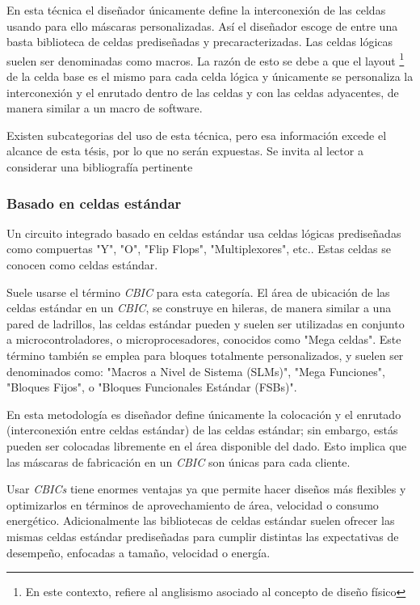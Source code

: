 {En esta técnica el diseñador únicamente define la interconexión de las celdas usando para ello máscaras personalizadas. Así el diseñador escoge de entre una basta biblioteca de celdas prediseñadas y precaracterizadas. Las celdas lógicas suelen ser denominadas como macros. La razón de esto se debe a que el layout \footnote{En este contexto, refiere al anglisismo asociado al concepto de diseño físico} de la celda base es el mismo para cada celda lógica y únicamente se personaliza la interconexión y el enrutado dentro de las celdas y con las celdas adyacentes, de manera similar a un macro de software.

Existen subcategorias del uso de esta técnica, pero esa información excede el alcance de esta tésis, por lo que no serán expuestas. Se invita al lector a considerar una bibliografía pertinente \cite{book:johnM1997,book:barrK2006}

\subsubsection{Basado en celdas estándar}

Un circuito integrado basado en celdas estándar usa celdas lógicas prediseñadas como compuertas "Y", "O", "Flip Flops", "Multiplexores", etc.. Estas celdas se conocen como celdas estándar.

Suele usarse el término \textit{CBIC} para esta categoría. El área de ubicación de las celdas estándar en un \textit{CBIC}, se construye en hileras, de manera similar a una pared de ladrillos, las celdas estándar pueden y suelen ser utilizadas en conjunto a microcontroladores, o microprocesadores, conocidos como "Mega celdas". Este término también se emplea para bloques totalmente personalizados, y suelen ser denominados como: "Macros a Nivel de Sistema (SLMs)", "Mega Funciones", "Bloques Fijos", o "Bloques Funcionales Estándar (FSBs)".

En esta metodología es diseñador define únicamente la colocación y el enrutado (interconexión entre celdas estándar) de las celdas estándar; sin embargo, estás pueden ser colocadas libremente en el área disponible del dado. Esto implica que las máscaras de fabricación en un \textit{CBIC} son únicas para cada cliente.

Usar \textit{CBICs} tiene enormes ventajas ya que permite hacer diseños más flexibles y optimizarlos en términos de aprovechamiento de área, velocidad o consumo energético. Adicionalmente las bibliotecas de celdas estándar suelen ofrecer las mismas celdas estándar prediseñadas para cumplir distintas las expectativas de desempeño, enfocadas a tamaño, velocidad o energía.

}
